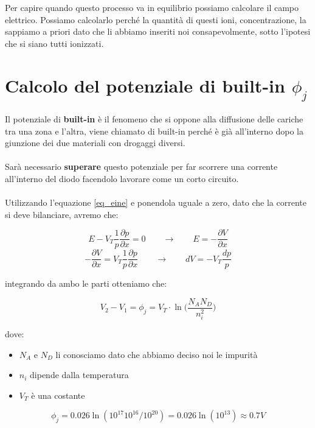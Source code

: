 Per capire quando questo processo va in equilibrio possiamo calcolare il campo elettrico. Possiamo calcolarlo perché la quantità di questi ioni, concentrazione, la sappiamo a priori dato che li abbiamo inseriti noi consapevolmente, sotto l'ipotesi che si siano tutti ionizzati.

\section{Calcolo del potenziale di built-in $\phi_j$}
Il potenziale di \textbf{built-in} è il fenomeno che si oppone alla diffusione delle cariche tra una zona e l'altra, viene chiamato di built-in perché è già all'interno dopo la giunzione dei due materiali con drogaggi diversi.
\paragraph{}
Sarà necessario \textbf{superare} questo potenziale per far scorrere una corrente all'interno del diodo facendolo lavorare come un corto circuito.

\paragraph{}
Utilizzando l'equazione \ref{eq_eine} e ponendola uguale a zero, dato che la corrente si deve bilanciare, avremo che:

\begin{equation*}
    E - V_T\frac{1}{p}\frac{\partial p}{\partial x} = 0 \qquad\longrightarrow\qquad E = -\frac{\partial V}{\partial x}
\end{equation*}
\begin{equation*}
    -\frac{\partial V}{\partial x} = V_T\frac{1}{p}\frac{\partial p}{\partial x}\qquad\longrightarrow\qquad dV = -V_T\frac{dp}{p}
\end{equation*}

integrando da ambo le parti otteniamo che:

\begin{equation}
    V_2 - V_1 = \phi_j = V_T\cdot \ln\biggl(\frac{N_AN_D}{n_i^2}\biggl)
\end{equation}

\newpage
dove:
\begin{itemize}
    \item $N_A \text{ e } N_D$ li conosciamo dato che abbiamo deciso noi le impurità
    \item $n_i$ dipende dalla temperatura
    \item $V_T$ è una costante
\end{itemize}
\begin{equation*}
    \phi_j = 0.026\ln(10^{17}10^{16}/10^{20}) = 0.026\ln(10^{13}) \approx 0.7V
\end{equation*}

